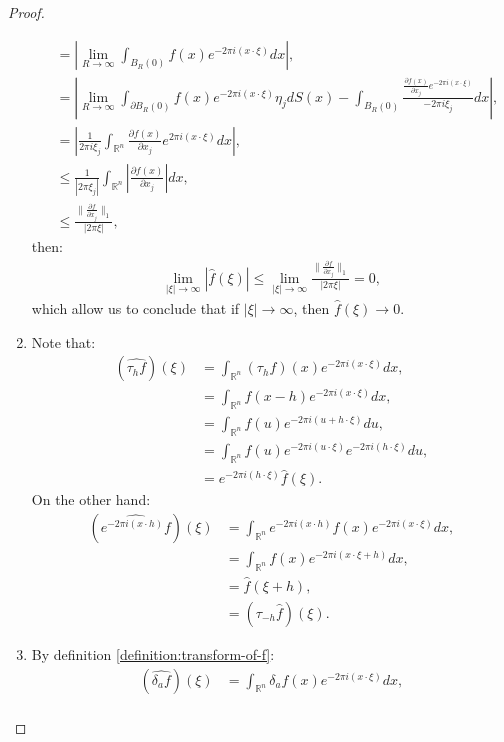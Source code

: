 \begin{proof}
\begin{enumerate}
\begin{align*}
        &=\left| \lim_{R \rightarrow \infty}\int_{B_R(0)}f(x)e^{-2\pi i (x\cdot \xi)}dx \right| ,\\
        &=\left|\lim_{R \rightarrow \infty}\int_{\partial B_R(0)}f(x)e^{-2\pi i (x\cdot \xi)}\eta_jdS(x)-\int_{B_R(0)}\frac{\frac{\partial f(x)}{\partial x_j}e^{-2\pi i (x\cdot \xi)}}{-2\pi i \xi_j}dx\right|,\\
        &=\left|\frac{1}{2\pi i \xi_j}\int_{\mathbb{R}^n} \frac{\partial f(x)}{\partial x_j}e^{2\pi i (x\cdot\xi)}dx\right|,\\
        &\leq \frac{1}{|2\pi\xi_j|}\int_{\mathbb{R}^n}\left|\frac{\partial f(x)}{\partial x_j}\right|dx,\\
				&\leq \frac{\|\frac{\partial f}{\partial x_j}\|_{1}}{|2\pi\xi|},
			\end{align*}
			then:
			\begin{align*}
				\lim_{|\xi|\rightarrow \infty}|\hat{f}(\xi)|\leq\lim_{|\xi|\rightarrow \infty}\frac{\|\frac{\partial f}{\partial x_j}\|_{1}}{|2\pi\xi|} = 0,
			\end{align*}
			which allow us to conclude that if $|\xi|\rightarrow \infty$, then $\hat{f}(\xi)\rightarrow 0$.
    \item Note that:
			\begin{align*}
				(\widehat{\tau_{h}f})(\xi)&=\int_{\mathbb{R}^n}(\tau_{h}f)(x)e^{-2\pi i (x\cdot\xi)}dx,\\
				&=\int_{\mathbb{R}^n}f(x-h)e^{-2\pi i (x\cdot\xi)}dx,\\
				&=\int_{\mathbb{R}^n}f(u)e^{-2\pi i (u+h\cdot\xi)}du,\\
				&=\int_{\mathbb{R}^n}f(u)e^{-2\pi i (u\cdot\xi)}e^{-2\pi i (h\cdot\xi)}du,\\
				&=e^{-2\pi i (h\cdot\xi)}\hat{f}(\xi).
			\end{align*}
			On the other hand:
			\begin{align*}
				(\widehat{e^{-2\pi i(x\cdot h)}f})(\xi)&=\int_{\mathbb{R}^n}e^{-2\pi i(x\cdot h)}f(x)e^{-2\pi i (x\cdot\xi)}dx,\\
				&=\int_{\mathbb{R}^n}f(x)e^{-2\pi i (x\cdot\xi+h)}dx,\\
				&=\hat{f}(\xi+h),\\
				&=(\tau_{-h}\hat{f})(\xi).
			\end{align*}
    \item By definition \cref{definition:transform-of-f}:
			\begin{align*}
				(\widehat{\delta_{a}f})(\xi)&=\int_{\mathbb{R}^n}\delta_{a}f(x)e^{-2\pi i (x\cdot\xi)}dx,\\

\end{align*}
\end{enumerate}
\end{proof}
